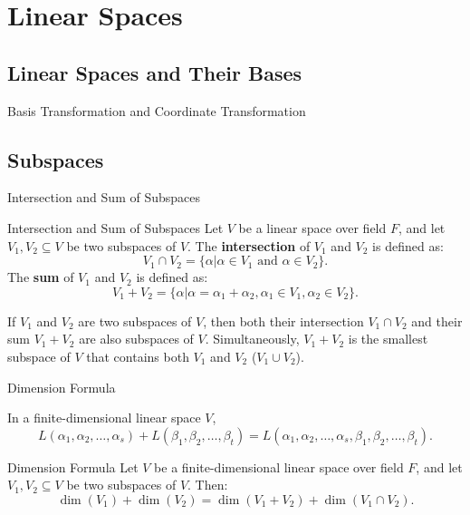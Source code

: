 \documentclass[11pt]{../../TexTemplate/elegantbook} %
\begin{document}
\chapter{Linear Spaces}
\section{Linear Spaces and Their Bases}

\begin{leftbarTitle}{Basis Transformation and Coordinate Transformation}\end{leftbarTitle}


\section{Subspaces}
\begin{leftbarTitle}{Intersection and Sum of Subspaces}\end{leftbarTitle}
\begin{definition}{Intersection and Sum of Subspaces}
    Let \( V \) be a linear space over field \( F \), 
    and let \( V_1, V_2 \subseteq V \) be two subspaces of \( V \).
    The \textbf{intersection} of \( V_1 \) and \( V_2 \) is defined as:
    \[
    V_1 \cap V_2 = \{ \alpha | \alpha \in V_1 \text{ and } \alpha \in V_2 \}.
    \]
    The \textbf{sum} of \( V_1 \) and \( V_2 \) is defined as:
    \[
    V_1 + V_2 = \{ \alpha | \alpha = \alpha_1 + \alpha_2, 
    \alpha_1 \in V_1, \alpha_2 \in V_2 \}.
    \]
\end{definition}

If \( V_1 \) and \( V_2 \) are two subspaces of \( V \), 
then both their intersection \( V_1 \cap V_2 \) and their sum \( V_1 + V_2 \) are also subspaces of \( V \).
Simultaneously, \( V_{1}+V_{2} \) is the smallest subspace of \( V \) 
that contains both \( V_1 \) and \( V_2 \) (\(V_{1}\cup V_{2}\)).

\begin{leftbarTitle}{Dimension Formula}\end{leftbarTitle}
\begin{proposition}
    In a finite-dimensional linear space \( V \),
    \[
    L(\alpha_1, \alpha_2, \dots, \alpha_s) + L(\beta_1, \beta_2, \dots, \beta_t) = 
    L(\alpha_1, \alpha_2, \dots, \alpha_s, \beta_1, \beta_2, \dots, \beta_t).
    \]
\end{proposition}

\begin{theorem}{Dimension Formula}\label{thm:dimension_formula}
    Let \( V \) be a finite-dimensional linear space over field \( F \), 
    and let \( V_1, V_2 \subseteq V \) be two subspaces of \( V \). Then:
    \[
    \dim(V_1) + \dim(V_2) = \dim(V_1 + V_2) + \dim(V_1 \cap V_2).
    \]
    
\end{theorem}
\end{document}
